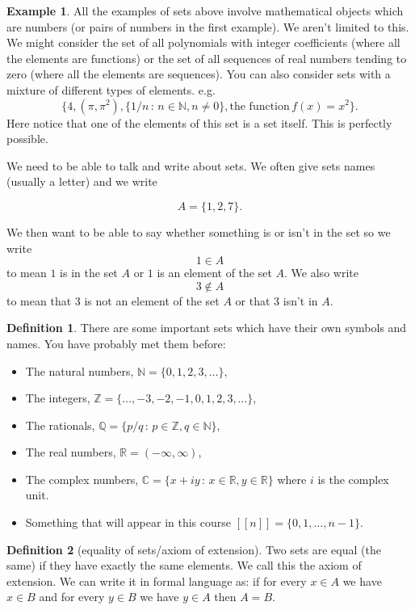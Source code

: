 \documentclass[
]{book}
\theoremstyle{definition}
\newtheorem{definition}{Definition}[chapter]
\theoremstyle{definition}
\newtheorem{example}{Example}[chapter]
\theoremstyle{definition}
\theoremstyle{definition}
\theoremstyle{remark}
\begin{document}
\begin{example}
All the examples of sets above involve mathematical objects which are numbers (or pairs of numbers in the first example). We aren't limited to this. We might consider the set of all polynomials with integer coefficients (where all the elements are functions) or the set of all sequences of real numbers tending to zero (where all the elements are sequences). You can also consider sets with a mixture of different types of elements. e.g.~
\[ \{ 4, (\pi, \pi^2), \{1/n \,:\, n \in \mathbb{N}, n \neq 0 \}, \mbox{the function}\, f(x) = x^2\}.  \] Here notice that one of the elements of this set is a set itself. This is perfectly possible.
\end{example}

We need to be able to talk and write about sets. We often give sets names (usually a letter) and we write

\[ A = \{1,2,7\}.  \]

We then want to be able to say whether something is or isn't in the set so we write
\[ 1 \in A  \] to mean \(1\) is in the set \(A\) or \(1\) is an element of the set \(A\). We also write
\[ 3 \notin A \] to mean that \(3\) is not an element of the set \(A\) or that 3 isn't in \(A\).

\begin{definition}

There are some important sets which have their own symbols and names. You have probably met them before:

\begin{itemize}
\item
  The natural numbers, \(\mathbb{N}= \{0, 1,2,3,\dots\}\),
\item
  The integers, \(\mathbb{Z} = \{ \dots, -3, -2, -1, 0, 1, 2, 3, \dots \}\),
\item
  The rationals, \(\mathbb{Q} = \{p/q \,:\, p \in \mathbb{Z}, q \in \mathbb{N}\}\),
\item
  The real numbers, \(\mathbb{R} = (-\infty, \infty)\),
\item
  The complex numbers, \(\mathbb{C} = \{x+iy \,:\, x \in \mathbb{R}, y \in \mathbb{R}\}\) where \(i\) is the complex unit.
\item
  Something that will appear in this course \([[n]]= \{0,1,\dots, n-1\}\).
\end{itemize}

\end{definition}

\begin{definition}[equality of sets/axiom of extension]
Two sets are equal (the same) if they have exactly the same elements. We call this the axiom of extension. We can write it in formal language as: if for every \(x \in A\) we have \(x \in B\) and for every \(y \in B\) we have \(y \in A\) then \(A=B\).
\end{definition}
\end{document}
